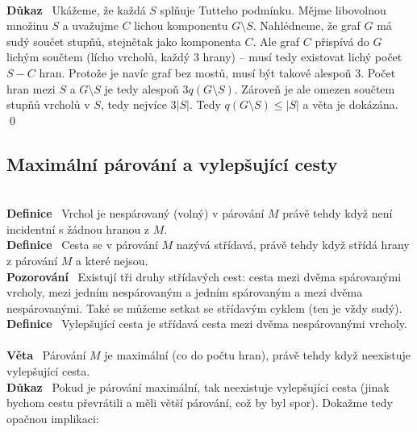\documentclass{article}
\renewcommand{\paragraph}[1]{\ \\\smallskip\noindent\textbf{#1}\ }
\begin{document}
\paragraph{Důkaz}
Ukážeme, že každá $S$ splňuje Tutteho podmínku. Mějme libovolnou množinu $S$ a 
uvažujme $C$ lichou komponentu $G\setminus S$. Nahlédneme, že graf $G$ má sudý 
součet stupňů, stejnětak jako komponenta $C$. Ale graf $C$ přispívá do $G$ 
lichým součtem (lícho vrcholů, každý 3 hrany) -- musí tedy existovat lichý počet 
$S-C$ hran. Protože je navíc graf bez mostů, musí být takové alespoň 3.
Počet hran mezi $S$ a $G\setminus S$ je tedy alespoň $3q(G \setminus S)$.  
Zároveň je ale omezen součtem stupňů vrcholů v $S$, tedy nejvíce $3|S|$. Tedy 
$q(G\setminus S) \leq |S|$ a věta je dokázána.
\qed

\subsection{Maximální párování a vylepšující cesty}
\paragraph{Definice} Vrchol je nespárovaný (volný) v párování $M$ právě tehdy 
když není incidentní s žádnou hranou z $M$.
\paragraph{Definice} Cesta se v párování $M$ nazývá střídavá, právě tehdy když 
střídá hrany z párování $M$ a které nejsou.
\paragraph{Pozorování} Existují tři druhy střídavých cest: cesta mezi dvěma 
spárovanými vrcholy, mezi jedním nespárovaným a jedním spárovaným a mezi dvěma 
nespárovanými. Také se můžeme setkat se střídavým cyklem (ten je vždy sudý).
\paragraph{Definice} Vylepšující cesta je střídavá cesta mezi dvěma 
nespárovanými vrcholy.
\paragraph{Věta} Párování $M$ je maximální (co do počtu hran), právě tehdy když 
neexistuje vylepšující cesta.
\paragraph{Důkaz} Pokud je párování maximální, tak neexistuje vylepšující cesta 
(jinak bychom cestu převrátili a měli větší párování, což by byl spor). Dokažme 
tedy opačnou implikaci:
\end{document}
